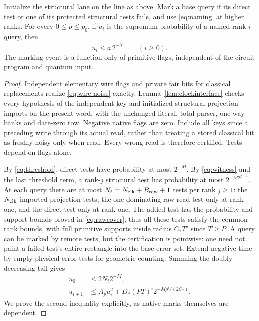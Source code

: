 \begin{lemma}\label{lem:probability}
Initialize the structural lane on the line as above. Mark a base query if its direct test or one of its protected structural tests fails, and use \eqref{eq:naming} at higher ranks. For every $0\le p\le p_0$, if $u_i$ is the supremum probability of a named rank-$i$ query, then
\begin{equation}\label{eq:rankdecay}
 u_i\le a\,2^{-\lambda^i}\qquad(i\ge0).
\end{equation}
The marking event is a function only of primitive flags, independent of the circuit program and quantum input.
\end{lemma}
\begin{proof}
Independent elementary wire flags and private fair bits for classical replacements realize \eqref{eq:wire-noise} exactly. Lemma~\ref{lem:clockinterface} checks every hypothesis of the independent-key and initialized structural projection imports on the present word, with the unchanged literal, total parser, one-way banks and date-zero row. Negative native flags are zero. Include all keys since a preceding write through its actual read, rather than treating a stored classical bit as freshly noisy only when read. Every wrong read is therefore certified. Tests depend on flags alone.

By \eqref{eq:threshold}, direct tests have probability at most $2^{-M}$. By \eqref{eq:witness} and the last threshold term, a rank-$j$ structural test has probability at most $2^{-M2^{j-1}}$. At each query there are at most $N_t=N_{\rm clk}+B_{\rm raw}+1$ tests per rank $j\ge1$: the $N_{\rm clk}$ imported projection tests, the one dominating raw-read test only at rank one, and the direct test only at rank one. The added test has the probability and support bounds proved in \eqref{eq:rawcover}; thus all these tests satisfy the common rank bounds, with full primitive supports inside radius $C_*T^j$ since $T\ge P$. A query can be marked by remote tests, but the certification is pointwise: one need not paint a failed test's entire rectangle into the base error set. Extend negative time by empty physical-error tests for geometric counting. Summing the doubly decreasing tail gives
\begin{equation}\label{eq:recurrence}
\begin{split}
 u_0&\le2N_t2^{-M},\\
 u_{i+1}&\le A_pu_i^2+
 D_*(PT)^i2^{-M\rho^i/(2C_*)}.
\end{split}
\end{equation}
We prove the second inequality explicitly, as native marks themselves are dependent.


\end{proof}
